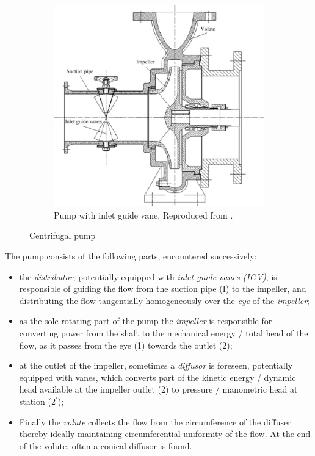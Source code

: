 \begin{figure}[!h]
{\begin{subfigure}{0.7\textwidth}
      \includegraphics[width=\textwidth]{pumps/centrifugalPump_igv.png}
      \caption{Pump with inlet guide vane. Reproduced from \cite{TZC+96}.}
    \end{subfigure}
  }
  \caption{Centrifugal pump}
  \label{fig:centrifugalPump}
\end{figure}
The pump consists of the following parts, encountered successively:
\begin{itemize}
\item the \emph{distributor}, potentially equipped with \emph{inlet
    guide vanes (IGV)}, is responsible of guiding the flow from the
  suction pipe (I) to the impeller, and distributing the flow
  tangentially homogeneously over the \emph{eye} of the
  \emph{impeller};
\item as the sole rotating part of the pump the \emph{impeller} is
  responsible for converting power from the shaft to the mechanical
  energy / total head of the flow, as it passes from the eye (1)
  towards the outlet (2);
\item at the outlet of the impeller, sometimes a \emph{diffusor} is
  foreseen, potentially equipped with vanes, which converts part of
  the kinetic energy / dynamic head available at the impeller outlet
  (2) to pressure / manometric head at station (2$^\prime$);
\item Finally the \emph{volute} collects the flow from the
  circumference of the diffuser thereby ideally maintaining
  circumferential uniformity of the flow. At the end of the volute,
  often a conical diffusor is found.
\end{itemize}


